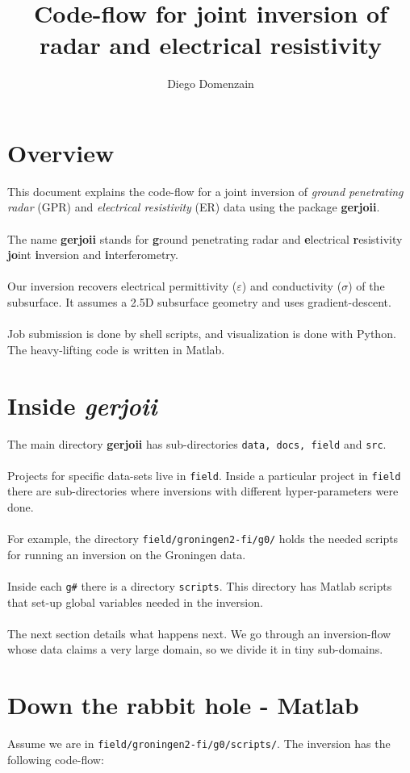 \documentclass[11pt, oneside]{article}   	%
\title{Code-flow for joint inversion of radar and electrical resistivity}
\author{Diego Domenzain}
\date{}							%
\begin{document}
\maketitle
\section{Overview}
This document explains the code-flow for a joint inversion of {\it ground penetrating radar } (GPR) and {\it electrical resistivity} (ER) data using the package {\bf gerjoii}. 
\\\\
The name {\bf gerjoii} stands for {\bf g}round penetrating radar and {\bf e}lectrical {\bf r}esistivity {\bf jo}int {\bf i}nversion and {\bf i}nterferometry. 
\\\\
Our inversion recovers electrical permittivity ($\varepsilon$) and conductivity ($\sigma$) of the subsurface. It assumes a 2.5D subsurface geometry and uses gradient-descent.
\\\\
Job submission is done by shell scripts, and visualization is done with Python. The heavy-lifting code is written in Matlab.
\section{Inside {\it gerjoii}}
The main directory {\bf gerjoii} has sub-directories {\tt data, docs, field} and {\tt src}. 
\\\\
Projects for specific data-sets live in {\tt field}. Inside a particular project in {\tt field} there are sub-directories where inversions with different hyper-parameters were done. 
\\\\
For example, the directory {\tt field/groningen2-fi/g0/} holds the needed scripts for running an inversion on the Groningen data. 
\\\\
Inside each {\tt g\#} there is a directory {\tt scripts}. This directory has Matlab scripts that set-up global variables needed in the inversion. 
\\\\
The next section details what happens next. We go through an inversion-flow whose data claims a very large domain, so we divide it in tiny sub-domains.

\section{Down the rabbit hole - Matlab}
Assume we are in {\tt field/groningen2-fi/g0/scripts/}. The inversion has the following code-flow:
\end{document}
